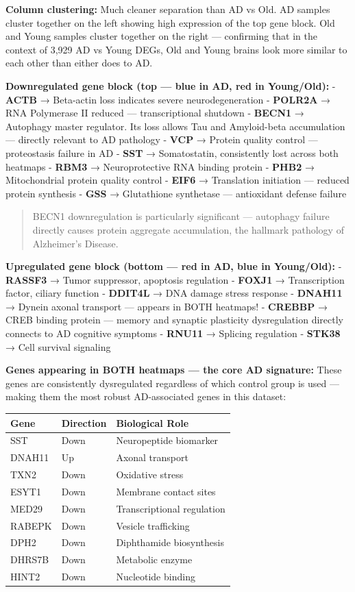 \documentclass[
]{article}
\begin{document}
\textbf{Column clustering:} Much cleaner separation than AD vs Old. AD
samples cluster together on the left showing high expression of the top
gene block. Old and Young samples cluster together on the right ---
confirming that in the context of 3,929 AD vs Young DEGs, Old and Young
brains look more similar to each other than either does to AD.

\textbf{Downregulated gene block (top --- blue in AD, red in
Young/Old):} - \textbf{ACTB} → Beta-actin loss indicates severe
neurodegeneration - \textbf{POLR2A} → RNA Polymerase II reduced ---
transcriptional shutdown - \textbf{BECN1} → Autophagy master regulator.
Its loss allows Tau and Amyloid-beta accumulation --- directly relevant
to AD pathology - \textbf{VCP} → Protein quality control ---
proteostasis failure in AD - \textbf{SST} → Somatostatin, consistently
lost across both heatmaps - \textbf{RBM3} → Neuroprotective RNA binding
protein - \textbf{PHB2} → Mitochondrial protein quality control -
\textbf{EIF6} → Translation initiation --- reduced protein synthesis -
\textbf{GSS} → Glutathione synthetase --- antioxidant defense failure

\begin{quote}
BECN1 downregulation is particularly significant --- autophagy failure
directly causes protein aggregate accumulation, the hallmark pathology
of Alzheimer's Disease.
\end{quote}

\textbf{Upregulated gene block (bottom --- red in AD, blue in
Young/Old):} - \textbf{RASSF3} → Tumor suppressor, apoptosis regulation
- \textbf{FOXJ1} → Transcription factor, ciliary function -
\textbf{DDIT4L} → DNA damage stress response - \textbf{DNAH11} → Dynein
axonal transport --- appears in BOTH heatmaps! - \textbf{CREBBP} → CREB
binding protein --- memory and synaptic plasticity dysregulation
directly connects to AD cognitive symptoms - \textbf{RNU11} → Splicing
regulation - \textbf{STK38} → Cell survival signaling

\textbf{Genes appearing in BOTH heatmaps --- the core AD signature:}
These genes are consistently dysregulated regardless of which control
group is used --- making them the most robust AD-associated genes in
this dataset:

\begin{longtable}[]{@{}lll@{}}
\toprule\noalign{}
Gene & Direction & Biological Role \\
\midrule\noalign{}
\endhead
\bottomrule\noalign{}
\endlastfoot
SST & Down & Neuropeptide biomarker \\
DNAH11 & Up & Axonal transport \\
TXN2 & Down & Oxidative stress \\
ESYT1 & Down & Membrane contact sites \\
MED29 & Down & Transcriptional regulation \\
RABEPK & Down & Vesicle trafficking \\
DPH2 & Down & Diphthamide biosynthesis \\
DHRS7B & Down & Metabolic enzyme \\
HINT2 & Down & Nucleotide binding \\
\end{longtable}
\end{document}
